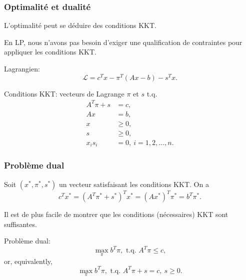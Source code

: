 \documentclass{beamer}
\begin{document}
\begin{frame}
\frametitle{Optimalité et dualité}

L'optimalité peut se déduire des conditions KKT.

\mbox{}

En LP, nous n'avons pas besoin d'exiger une qualification de
contraintes pour appliquer les conditions KKT.

\mbox{}

Lagrangien:
\[
\mathcal{L} = c^Tx - \pi^T(Ax-b) - s^Tx.
\]

Conditions KKT: vecteurs de Lagrange $\pi$ et $s$ t.q.
\begin{align*}
A^T\pi + s &= c,\\
Ax &= b,\\
x &\geq 0,\\
s &\geq 0,\\
x_is_i &= 0,\ i=1,2,\ldots,n.
\end{align*}

\end{frame}

\begin{frame}
\frametitle{Problème dual}

Soit $(x^*, \pi^*, s^*)$ un vecteur satisfaisant les conditions
KKT. On a
\[
c^Tx^* = (A^T\pi^*+s^*)^Tx^* = (Ax^*)^T\pi^* = b^T\pi^*.
\]

Il est de plus facile de montrer que les conditions (nécessaires) KKT
sont suffisantes.

\mbox{}

{\red Problème dual}:
\[
\max_\pi b^T\pi, \mbox{ t.q. } A^T\pi \leq c,
\]
or, equivalently,
\[
\max_\pi b^T\pi, \mbox{ t.q. } A^T\pi +s = c,\ s \geq 0.
\]

\end{frame}
\end{document}
